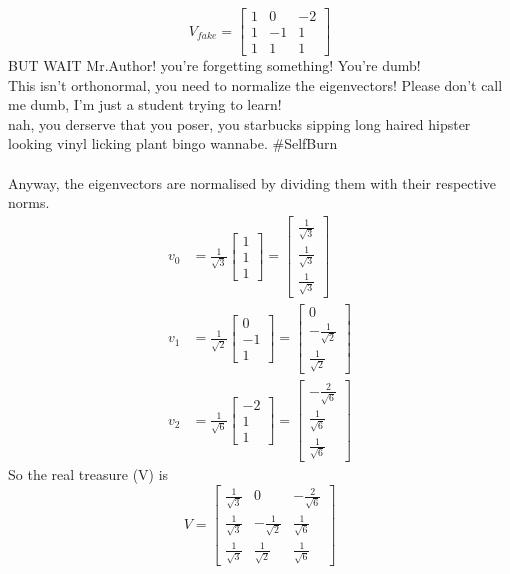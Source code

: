 \documentclass[12pt]{article}
\begin{document}
\begin{equation*}
    V_{fake} = 
    \begin{bmatrix}
        1 & 0 & -2 \\
        1 & -1 & 1 \\
        1 & 1 & 1
    \end{bmatrix}
\end{equation*}
BUT WAIT Mr.Author! you're forgetting something! You're dumb!\\
This isn't orthonormal, you need to normalize the eigenvectors! Please don't call me dumb, I'm just a student trying to learn!\\
nah, you derserve that you poser, you starbucks sipping long haired hipster looking vinyl licking plant bingo wannabe. \#SelfBurn\\\\
Anyway, the eigenvectors are normalised by dividing them with their respective norms.
\begin{align*}
    v_0 &= \frac{1}{\sqrt{3}}\begin{bmatrix}
        1 \\
        1 \\
        1
    \end{bmatrix} = \begin{bmatrix}
        \frac{1}{\sqrt{3}} \\
        \frac{1}{\sqrt{3}} \\
        \frac{1}{\sqrt{3}}
    \end{bmatrix} \\
    v_1 &= \frac{1}{\sqrt{2}}\begin{bmatrix}
        0 \\
        -1 \\
        1
    \end{bmatrix} = \begin{bmatrix}
        0 \\
        -\frac{1}{\sqrt{2}} \\
        \frac{1}{\sqrt{2}}
    \end{bmatrix} \\
    v_2 &= \frac{1}{\sqrt{6}}\begin{bmatrix}
        -2 \\
        1 \\
        1
    \end{bmatrix} = \begin{bmatrix}
        -\frac{2}{\sqrt{6}} \\
        \frac{1}{\sqrt{6}} \\
        \frac{1}{\sqrt{6}}
    \end{bmatrix}
\end{align*}
So the real treasure (V) is 
\begin{equation}\label{Ortho basis}
    V = 
    \begin{bmatrix}
        \frac{1}{\sqrt{3}} & 0 & -\frac{2}{\sqrt{6}} \\
        \frac{1}{\sqrt{3}} & -\frac{1}{\sqrt{2}} & \frac{1}{\sqrt{6}} \\
        \frac{1}{\sqrt{3}} & \frac{1}{\sqrt{2}} & \frac{1}{\sqrt{6}}
    \end{bmatrix}
\end{equation}
\end{document}
